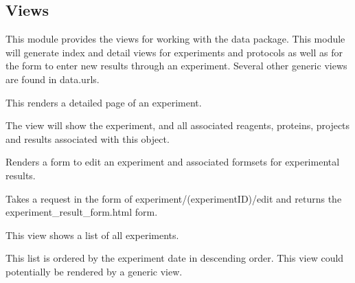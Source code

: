 \documentclass[letterpaper,10pt,english]{sphinxmanual}
\begin{document}
\subsection{Views}
\label{api:module-experimentdb.data.views}\label{api:views}
This module provides the views for working with the data package.
This module will generate index and detail views for experiments and protocols as well as for the form to enter new results through an experiment.  Several other generic views are found in data.urls.


\begin{fulllineitems}
\label{api:experimentdb.data.views.experiment}
This renders a detailed page of an experiment.


The view will show the experiment, and all associated reagents, proteins, projects and results associated with this object.


\end{fulllineitems}


\begin{fulllineitems}
\label{api:experimentdb.data.views.experiment_edit}
Renders a form to edit an experiment and associated formsets for experimental results.


Takes a request in the form of experiment/(experimentID)/edit and returns the experiment\_result\_form.html form.


\end{fulllineitems}


\begin{fulllineitems}
\label{api:experimentdb.data.views.index}
This view shows a list of all experiments.


This list is ordered by the experiment date in descending order.  This view could potentially be rendered by a generic view.


\end{fulllineitems}
\end{document}

